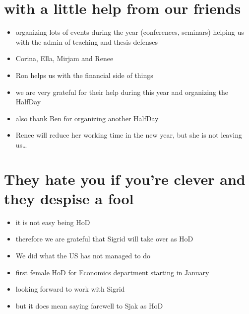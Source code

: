 \documentclass[a4paper,12pt]{article}
\begin{document}
\section*{with a little help from our friends}
\label{sec:orge0b907f}
\begin{itemize}
\item organizing lots of events during the year (conferences, seminars) helping us with the admin of teaching and thesis defenses
\item Corina, Ella, Mirjam and Renee
\item Ron helps us with the financial side of things
\item we are very grateful for their help during this year and organizing the HalfDay
\item also thank Ben for organizing another HalfDay
\item Renee will reduce her working time in the new year, but she is not leaving us\ldots{}
\end{itemize}
\section*{They hate you if you're clever and they despise a fool}
\label{sec:org76c0f2a}
\begin{itemize}
\item it is not easy being HoD
\item therefore we are grateful that Sigrid will take over as HoD
\item We did what the US has not managed to do
\item first female HoD for Economics department starting in January
\item looking forward to work with Sigrid
\item but it does mean saying farewell to Sjak as HoD
\end{itemize}
\end{document}
